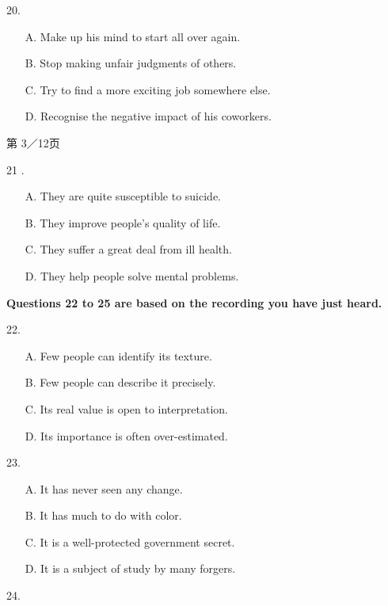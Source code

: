 \documentclass[UTF8,11pt]{ctexart}
\begin{document}
20.


\begin{itemize}[leftmargin=2em,itemsep=.2em,topsep=.4em]\item[A.] Make up his mind to start all over again.
\item[B.] Stop making unfair judgments of others.
\item[C.] Try to find a more exciting job somewhere else.
\item[D.] Recognise the negative impact of his coworkers.
\end{itemize}

第 3／12页


21 .


\begin{itemize}[leftmargin=2em,itemsep=.2em,topsep=.4em]\item[A.] They are quite susceptible to suicide.
\item[B.] They improve people's quality of life.
\item[C.] They suffer a great deal from ill health.
\item[D.] They help people solve mental problems.
\end{itemize}

\textbf{Questions 22 to 25 are based on the recording you have just heard.}


22.


\begin{itemize}[leftmargin=2em,itemsep=.2em,topsep=.4em]\item[A.] Few people can identify its texture.
\item[B.] Few people can describe it precisely.
\item[C.] Its real value is open to interpretation.
\item[D.] Its importance is often over-estimated.
\end{itemize}

23.


\begin{itemize}[leftmargin=2em,itemsep=.2em,topsep=.4em]\item[A.] It has never seen any change.
\item[B.] It has much to do with color.
\item[C.] It is a well-protected government secret.
\item[D.] It is a subject of study by many forgers.
\end{itemize}

24.
\end{document}
